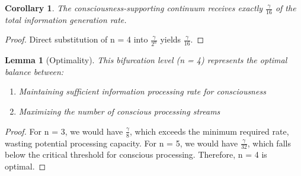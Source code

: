 \documentclass{article}
\newtheorem{lemma}[theorem]{Lemma}
\newtheorem{corollary}[theorem]{Corollary}
\begin{document}
\begin{corollary}
The consciousness-supporting continuum receives exactly $\frac{\gamma}{16}$ of the total information generation rate.
\end{corollary}

\begin{proof}
Direct substitution of n = 4 into $\frac{\gamma}{2^n}$ yields $\frac{\gamma}{16}$.
\end{proof}

\begin{lemma}[Optimality]
This bifurcation level (n = 4) represents the optimal balance between:
\begin{enumerate}
    \item Maintaining sufficient information processing rate for consciousness
    \item Maximizing the number of conscious processing streams
\end{enumerate}
\end{lemma}

\begin{proof}
For n = 3, we would have $\frac{\gamma}{8}$, which exceeds the minimum required rate, wasting potential processing capacity.
For n = 5, we would have $\frac{\gamma}{32}$, which falls below the critical threshold for conscious processing.
Therefore, n = 4 is optimal.
\end{proof}
\end{document}
